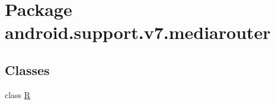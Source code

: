 \hypertarget{namespaceandroid_1_1support_1_1v7_1_1mediarouter}{
\section{Package android.support.v7.mediarouter}
\label{namespaceandroid_1_1support_1_1v7_1_1mediarouter}
}
\subsection*{Classes}
\begin{CompactItemize}
\item 
class \hyperlink{classandroid_1_1support_1_1v7_1_1mediarouter_1_1_r}{R}
\end{CompactItemize}
